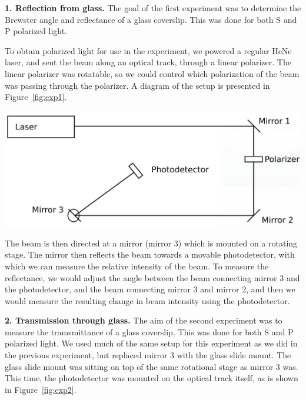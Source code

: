 \documentclass{article}
\newenvironment{2colfig}{
  \par\medskip\noindent\minipage{\linewidth}
} {
  \endminipage\par\medskip
}
\begin{document}
\begin{multicols*}{2}
{\bf 1. Reflection from glass.} The goal of the first experiment was to determine the Brewster angle and reflectance of
a glass coverslip. This was done for both S and P polarized light. 

To obtain polarized light for use in the experiment, we powered a regular HeNe laser, and sent the beam along an optical
track, through a linear polarizer. The linear polarizer was rotatable, so we could control which polarization of the
beam was passing through the polarizer. A diagram of the setup is presented in Figure~\ref{fig:exp1}.

\begin{2colfig}
  \center
  \includegraphics[scale=.2]{exp1}
  \label{fig:exp1}
\end{2colfig}

The beam is then directed at a mirror (mirror 3) which is mounted on a rotating stage. The mirror then reflects the beam
towards a movable photodetector, with which we can measure the relative intensity of the beam. To measure the
reflectance, we would adjust the angle between the beam connecting mirror 3 and the photodetector, and the beam
connecting mirror 3 and mirror 2, and then we would measure the resulting change in beam intensity using the
photodetector.

{\bf 2. Transmission through glass.} The aim of the second experiment was to measure the tramsmittance of a glass
coverslip. This was done for both S and P polarized light. We used much of the same setup for this experiment as we did
in the previous experiment, but replaced mirror 3 with the glass slide mount. The glass slide mount was sitting on top
of the same rotational stage as mirror 3 was. This time, the photodetector was mounted on the optical track itself, as
is shown in Figure~\ref{fig:exp2}.


\end{multicols*}
\end{document}
